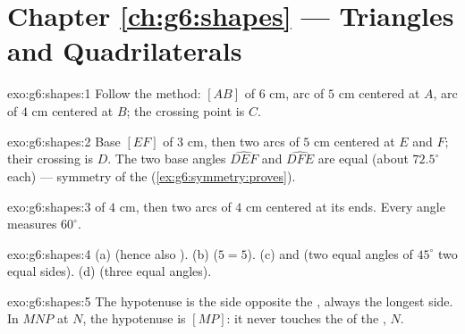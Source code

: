 \section*{Chapter \ref{ch:g6:shapes} --- Triangles and Quadrilaterals}

\begin{solution}{exo:g6:shapes:1}
Follow the method:  $[AB]$ of $6$ cm, arc of  $5$ cm
centered at $A$, arc of  $4$ cm centered at $B$; the crossing
point is $C$.
\end{solution}

\begin{solution}{exo:g6:shapes:2}
Base $[EF]$ of $3$ cm, then two arcs of  $5$ cm centered at $E$
and $F$; their crossing is $D$. The two base angles $\widehat{DEF}$
and $\widehat{DFE}$ are equal (about $72.5^\circ$ each) --- symmetry of
the  (\cref{ex:g6:symmetry:proves}).
\end{solution}

\begin{solution}{exo:g6:shapes:3}
 of $4$ cm, then two arcs of  $4$ cm centered at its
ends. Every angle measures $60^\circ$.
\end{solution}

\begin{solution}{exo:g6:shapes:4}
(a)  (hence also ). \quad
(b)  ($5 = 5$). \quad
(c)  and  (two equal angles of $45^\circ$  two
equal sides). \quad
(d)  (three equal angles).
\end{solution}

\begin{solution}{exo:g6:shapes:5}
The hypotenuse is the side opposite the , always the longest
side. In $MNP$  at $N$, the hypotenuse is $[MP]$: it never
touches the  of the , $N$.
\end{solution}

